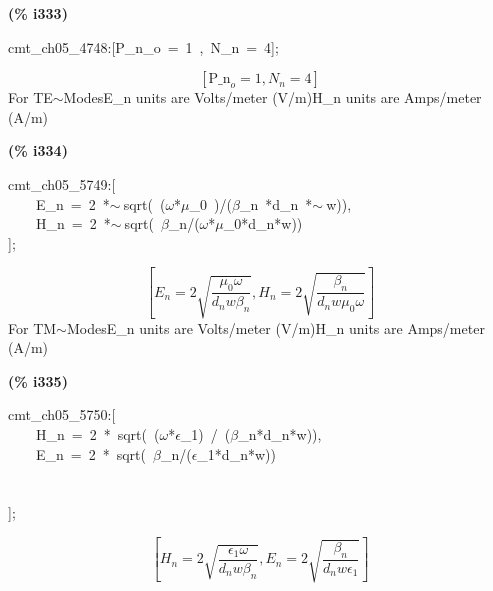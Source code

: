 \documentclass[fleqn]{article}
\begin{document}
\noindent
\begin{minipage}[t]{4.000000em}\color{red}\bfseries
(\% i333)	
\end{minipage}
\begin{minipage}[t]{\textwidth}\color{blue}
cmt\_ch05\_4748:[P\_n\_o\ =\ 1\ ,\ N\_n\ =\ 4];
\end{minipage}
\[\displaystyle \tag{\% o333} 
\left[ {{\ensuremath{\mathrm{P\_ n}}}_o}=1\operatorname{,}{N_n}=4\right] \mbox{}
\]
For TE\ensuremath{\sim }ModesE\_n units are Volts/meter (V/m)H\_n units are Amps/meter (A/m)


\noindent
\begin{minipage}[t]{4.000000em}\color{red}\bfseries
(\% i334)	
\end{minipage}
\begin{minipage}[t]{\textwidth}\color{blue}
cmt\_ch05\_5749:[\\
\ \ \ \ E\_n\ =\ 2\ *\ensuremath{\sim\ }sqrt(\ (\ensuremath{\omega}*\ensuremath{\mu}\_0\ )/(\ensuremath{\beta}\_n\ *d\_n\ *\ensuremath{\sim\ }w)),\\
\ \ \ \ H\_n\ =\ 2\ *\ensuremath{\sim\ }sqrt(\ \ensuremath{\beta}\_n/(\ensuremath{\omega}*\ensuremath{\mu}\_0*d\_n*w))\\
];
\end{minipage}
\[\displaystyle \tag{\% o334} 
\left[ {E_n}=2 \sqrt{\frac{{{\mu }_0} \omega }{{d_n} w {{\beta }_n}}}\operatorname{,}{H_n}=2 \sqrt{\frac{{{\beta }_n}}{{d_n} w {{\mu }_0} \omega }}\right] \mbox{}
\]
For TM\ensuremath{\sim }ModesE\_n units are Volts/meter (V/m)H\_n units are Amps/meter (A/m)


\noindent
\begin{minipage}[t]{4.000000em}\color{red}\bfseries
(\% i335)	
\end{minipage}
\begin{minipage}[t]{\textwidth}\color{blue}
cmt\_ch05\_5750:[\\
\ \ \ \ H\_n\ =\ 2\ *\ sqrt(\ (\ensuremath{\omega}*\ensuremath{\epsilon}\_1)\ /\ (\ensuremath{\beta}\_n*d\_n*w)),\\
\ \ \ \ E\_n\ =\ 2\ *\ sqrt(\ \ensuremath{\beta}\_n/(\ensuremath{\epsilon}\_1*d\_n*w))\\
\\
\\
];
\end{minipage}
\[\displaystyle \tag{\% o335} 
\left[ {H_n}=2 \sqrt{\frac{{{\epsilon }_1} \omega }{{d_n} w {{\beta }_n}}}\operatorname{,}{E_n}=2 \sqrt{\frac{{{\beta }_n}}{{d_n} w {{\epsilon }_1}}}\right] \mbox{}
\]
\end{document}

